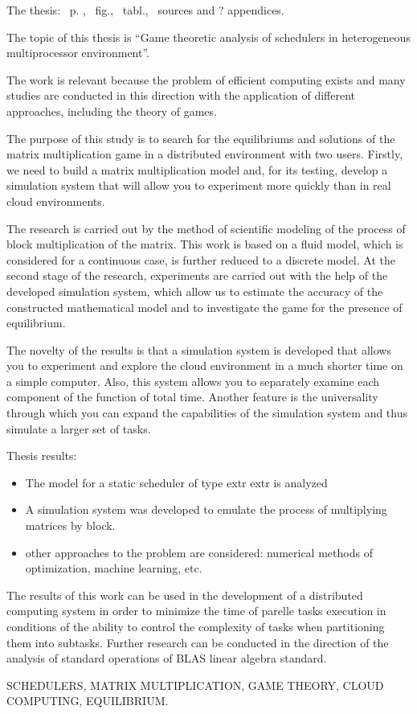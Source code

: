 
The thesis: \pageref*{MyLastPage}~p. , \totfig~fig., \tottab~tabl., ~sources and ? appendices.

The topic of this thesis is ``Game theoretic analysis of schedulers in heterogeneous multiprocessor environment''.

The work is relevant because the problem of efficient computing exists and many studies are conducted in this direction with the application of different approaches, including the theory of games.

The purpose of this study is to search for the equilibriums and solutions of the matrix multiplication game in a distributed environment with two users. Firstly, we need to build a matrix multiplication model and, for its testing, develop a simulation system that will allow you to experiment more quickly than in real cloud environments.

The research is carried out by the method of scientific modeling of the process of block multiplication of the matrix. This work is based on a fluid model, which is considered for a continuous case, is further reduced to a discrete model. At the second stage of the research, experiments are carried out with the help of the developed simulation system, which allow us to estimate the accuracy of the constructed mathematical model and to investigate the game for the presence of equilibrium.

The novelty of the results is that a simulation system is developed that allows you to experiment and explore the cloud environment in a much shorter time on a simple computer. Also, this system allows you to separately examine each component of the function of total time. Another feature is the universality through which you can expand the capabilities of the simulation system and thus simulate a larger set of tasks.

Thesis results:
\begin{itemize}
	\item The model for a static scheduler of type extr extr is analyzed
	\item A simulation system was developed to emulate the process of multiplying matrices by block.
	\item other approaches to the problem are considered: numerical methods of optimization, machine learning, etc.
\end{itemize}

The results of this work can be used in the development of a distributed computing system in order to minimize the time of parelle tasks execution in conditions of the ability to control the complexity of tasks when partitioning them into subtasks. Further research can be conducted in the direction of the analysis of standard operations of BLAS linear algebra standard.

\MakeUppercase{schedulers, matrix multiplication, game theory, cloud computing, equilibrium.} 